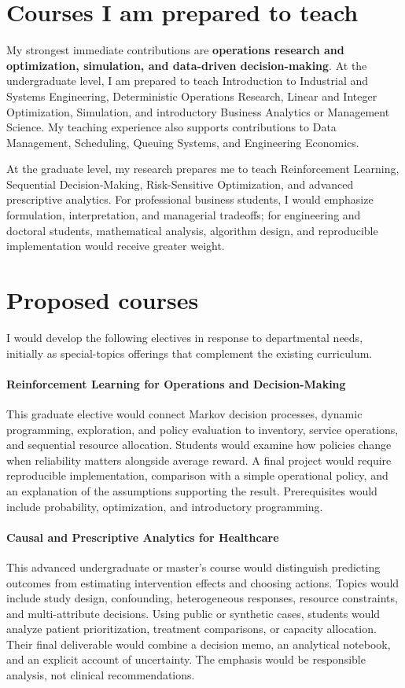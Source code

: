 \documentclass[11pt,letterpaper]{article}
\begin{document}
\section{Courses I am prepared to teach}

My strongest immediate contributions are \textbf{operations research and
optimization, simulation, and data-driven decision-making}. At the
undergraduate level, I am prepared to teach Introduction to Industrial and
Systems Engineering, Deterministic Operations Research, Linear and Integer
Optimization, Simulation, and introductory Business Analytics or Management
Science. My teaching experience also supports contributions to Data
Management, Scheduling, Queuing Systems, and Engineering Economics.

At the graduate level, my research prepares me to teach Reinforcement
Learning, Sequential Decision-Making, Risk-Sensitive Optimization, and
advanced prescriptive analytics. For professional business students, I
would emphasize formulation, interpretation, and managerial tradeoffs;
for engineering and doctoral students, mathematical analysis, algorithm
design, and reproducible implementation would receive greater weight.

\section{Proposed courses}

I would develop the following electives in response to departmental needs,
initially as special-topics offerings that complement the existing
curriculum.

\paragraph{Reinforcement Learning for Operations and Decision-Making}
This graduate elective would connect Markov decision processes, dynamic
programming, exploration, and policy evaluation to inventory, service
operations, and sequential resource allocation. Students would examine
how policies change when reliability matters alongside average reward.
A final project would require reproducible implementation, comparison
with a simple operational policy, and an explanation of the assumptions
supporting the result. Prerequisites would include probability,
optimization, and introductory programming.

\paragraph{Causal and Prescriptive Analytics for Healthcare}
This advanced undergraduate or master's course would distinguish predicting
outcomes from estimating intervention effects and choosing actions. Topics
would include study design, confounding, heterogeneous responses, resource
constraints, and multi-attribute decisions. Using public or synthetic cases,
students would analyze patient prioritization, treatment comparisons, or
capacity allocation. Their final deliverable would combine a decision memo,
an analytical notebook, and an explicit account of uncertainty. The
emphasis would be responsible analysis, not clinical recommendations.
\end{document}
